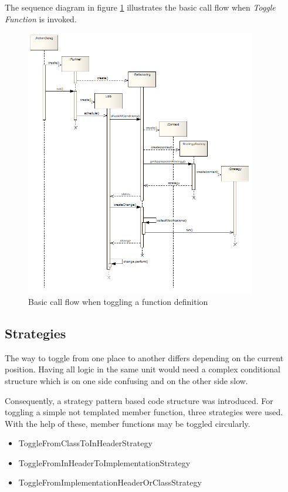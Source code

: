 The sequence diagram in figure \ref{sd} illustrates the basic call flow when 
\textit{Toggle Function} is invoked.
\begin{figure}[h]
  \centering
  \includegraphics[width=0.9\textwidth]{images/sequence_diagram.png}
  \caption{Basic call flow when toggling a function definition}
  \label{sd}
\end{figure}

\subsection{Strategies}

The way to toggle from one place to another differs depending on the current
position. Having all logic in the same unit would need a complex conditional
structure which is on one side confusing and on the other side slow.

Consequently, a strategy pattern based code structure was introduced. For
toggling a simple not templated member function, three strategies were used.
With the help of these, member functions may be toggled circularly.

\begin{itemize}
\item ToggleFromClassToInHeaderStrategy
\item ToggleFromInHeaderToImplementationStrategy
\item ToggleFromImplementationHeaderOrClassStrategy
\end{itemize}

